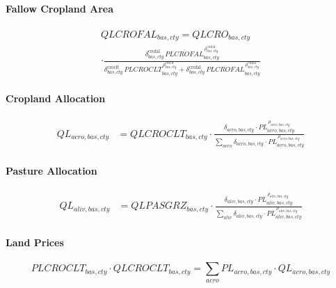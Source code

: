 \paragraph{Fallow Cropland Area}
\begin{multline}
  QLCROFAL_{bas,cty} = QLCRO_{bas,cty}\\
  \cdot
  \frac{
    \delta^{\text{crofal}}_{bas,cty}\, \overline{PLCROFAL}_{bas,cty}^{\,\rho^{\text{crofal}}_{bas,cty}}
  }{
    \delta^{\text{croclt}}_{bas,cty}\, PLCROCLT_{bas,cty}^{\,\rho^{\text{croclt}}_{bas,cty}}
    + \delta^{\text{crofal}}_{bas,cty}\, \overline{PLCROFAL}_{bas,cty}^{\,\rho^{\text{crofal}}_{bas,cty}}
  }
  \tag{QLCROFALEQ}\label{eq:QLCROFALEQ}
\end{multline}


\paragraph{Cropland Allocation}
\begin{align}
  QL_{acro,bas,cty}
  &= QLCROCLT_{bas,cty}
     \cdot
     \frac{
       \delta_{acro,bas,cty}\cdot PL_{acro,bas,cty}^{\,\rho_{acro,bas,cty}}
     }{
       \sum_{acro}\delta_{acro,bas,cty}\cdot PL_{acro,bas,cty}^{\,\rho_{acro,bas,cty}}
     }
  \tag{QLCRODISTEQ}\label{eq:QLCRODISTEQ}
\end{align}

\paragraph{Pasture Allocation}
\begin{align}
  QL_{aliv,bas,cty}
  &= QLPASGRZ_{bas,cty}
     \cdot
     \frac{
       \delta_{aliv,bas,cty}\cdot PL_{aliv,bas,cty}^{\,\rho_{aliv,bas,cty}}
     }{
       \sum_{aliv}\delta_{aliv,bas,cty}\cdot PL_{aliv,bas,cty}^{\,\rho_{aliv,bas,cty}}
     }
  \tag{QLLIVDISTEQ}\label{eq:QLLIVDISTEQ}
\end{align}


\paragraph{Land Prices}
\begin{equation}
  PLCROCLT_{bas,cty}\cdot QLCROCLT_{bas,cty}
  = \sum_{acro} PL_{acro,bas,cty}\cdot QL_{acro,bas,cty}
  \tag{PLCROCLTEQ}\label{eq:PLCROCLTEQ}
\end{equation}

\vspace{0.3\baselineskip}

